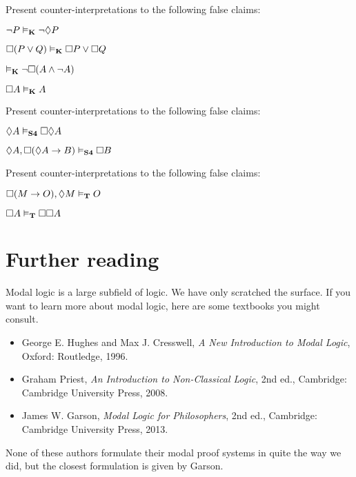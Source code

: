 \practiceproblems

\problempart
Present counter-interpretations to the following false claims:
\begin{compactlist}
	\item $\neg P \vDash_{\mathbf{K}} \neg\Diamond P$
	\item $\Box(P \vee Q)\vDash_{\mathbf{K}} \Box P \vee \Box Q$
	\item $\vDash_{\mathbf{K}} \neg \Box (A\wedge \neg A)$
	\item $\Box A\vDash_{\mathbf{K}} A$
\end{compactlist}

\problempart
Present counter-interpretations to the following false claims:
\begin{compactlist}
	\item $\Diamond A\vDash_{\mathbf{S4}} \Box\Diamond A$
	\item $\Diamond A, \Box (\Diamond A \rightarrow B)\vDash_{\mathbf{S4}}\Box B$
\end{compactlist}

\problempart
Present counter-interpretations to the following false claims:
\begin{compactlist}
	\item $\Box (M\rightarrow O),\Diamond M\vDash_{\mathbf{T}} O$
	\item $\Box A\vDash_{\mathbf{T}} \Box \Box A$
\end{compactlist}

\section*{Further reading}

Modal logic is a large subfield of logic. We have only scratched the surface. If you want to learn more about modal logic, here are some textbooks you might consult.

\begin{itemize}
	\item George E. Hughes and Max J. Cresswell, \textit{A New Introduction
	to Modal Logic}, Oxford: Routledge, 1996.
	\item Graham Priest, \textit{An Introduction to Non-Classical Logic},
	2nd ed., Cambridge: Cambridge University Press, 2008.
	\item James W. Garson, \textit{Modal Logic for Philosophers}, 2nd
	ed., Cambridge: Cambridge University Press, 2013.
\end{itemize}

None of these authors formulate their modal proof systems in quite the way we did, but the closest formulation is given by Garson.

